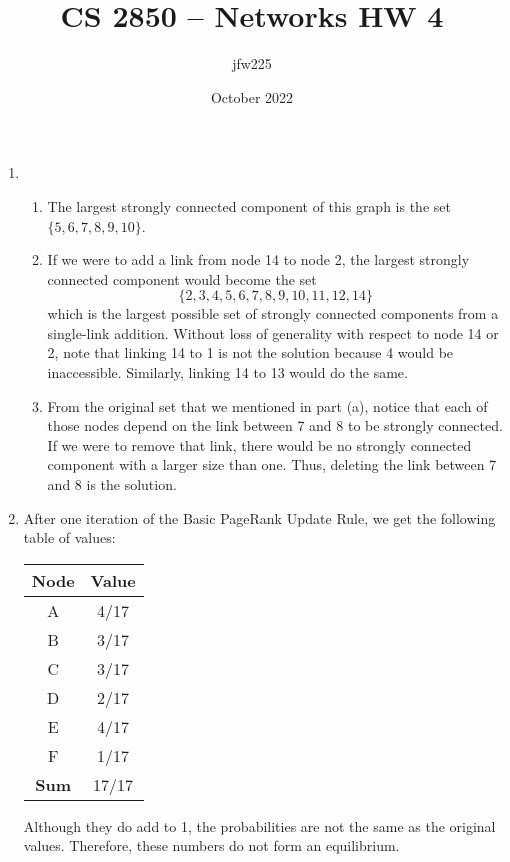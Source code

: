 \documentclass{article}
\title{CS 2850 -- Networks HW 4}
\author{jfw225 }
\date{October 2022}
\begin{document}
\maketitle

\begin{enumerate}
    \item \begin{enumerate}
            \item The largest strongly connected component of this graph is the set $\{5,6,7,8,9,10\}$.
            
            \item If we were to add a link from node 14 to node 2, the largest strongly connected component would become the set 
            $$\{2,3,4,5,6,7,8,9,10,11,12,14\}$$
            which is the largest possible set of strongly connected components from a single-link addition. Without loss of generality with respect to node 14 or 2, note that linking 14 to 1 is not the solution because 4 would be inaccessible. Similarly, linking 14 to 13 would do the same.
            
            \item From the original set that we mentioned in part (a), notice that each of those nodes depend on the link between 7 and 8 to be strongly connected. If we were to remove that link, there would be no strongly connected component with a larger size than one. Thus, deleting the link between 7 and 8 is the solution.

        \end{enumerate}

    \item After one iteration of the Basic PageRank Update Rule, we get the following table of values:
    \begin{center}\begin{tabular}{||c | c||} 
        \hline
        Node & Value \\ [0.5ex] 
        \hline\hline
        A & 4/17 \\
        \hline
        B & 3/17 \\
        \hline
        C & 3/17 \\
        \hline
        D & 2/17 \\
        \hline
        E & 4/17 \\
        \hline
        F & 1/17 \\
        \hline\hline
        \textbf{Sum} & 17/17 \\ [1ex] 
        \hline
    \end{tabular}\end{center}
    Although they do add to 1, the probabilities are not the same as the original values. Therefore, these numbers do not form an equilibrium.


\end{enumerate}
\end{document}
